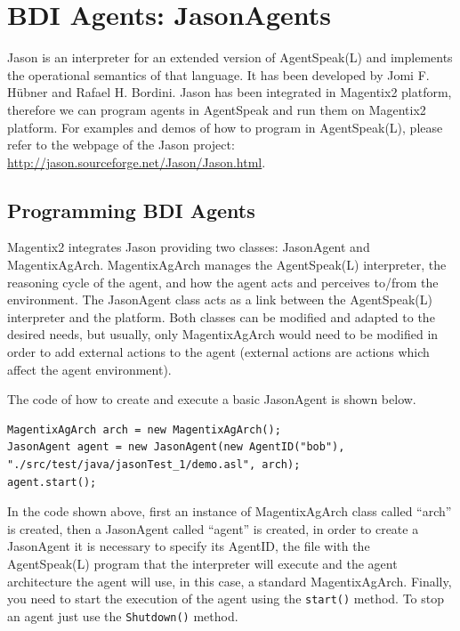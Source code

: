 \chapter{BDI Agents: JasonAgents}\label{chap:JasonAgents}
Jason\cite{bordini05} is an interpreter for an extended version of AgentSpeak(L)\cite{Rao96} and implements the operational semantics of that language. It has been developed by Jomi F. H\"ubner and Rafael H. Bordini. Jason has been integrated in Magentix2 platform, therefore we can program agents in AgentSpeak and run them on Magentix2 platform. For examples and demos of how to program in AgentSpeak(L), please refer to the webpage of the Jason project: \url{http://jason.sourceforge.net/Jason/Jason.html}.


\section{Programming BDI Agents} %

Magentix2 integrates Jason providing two classes: JasonAgent and MagentixAgArch. MagentixAgArch manages the AgentSpeak(L) interpreter, the reasoning cycle of the agent, and how the agent acts and perceives to/from the environment. The JasonAgent class acts as a link between the AgentSpeak(L) interpreter and the platform. Both classes can be modified and adapted to the desired needs, but usually, only MagentixAgArch would need to be modified in order to add external actions to the agent (external actions are actions which affect the agent environment).

The code of how to create and execute a basic JasonAgent is shown below.
\begin{lstlisting}[style=Java]
MagentixAgArch arch = new MagentixAgArch();
JasonAgent agent = new JasonAgent(new AgentID("bob"), "./src/test/java/jasonTest_1/demo.asl", arch);
agent.start();
\end{lstlisting}
In the code shown above, first an instance of MagentixAgArch class called ``arch'' is created, then a JasonAgent called ``agent'' is created, in order to create a JasonAgent it is necessary to specify its AgentID, the file with the AgentSpeak(L) program that the interpreter will execute and the agent architecture the agent will use, in this case, a standard MagentixAgArch. Finally, you need to start the execution of the agent using the \texttt{start()} method. To stop an agent just use the \texttt{Shutdown()} method.

